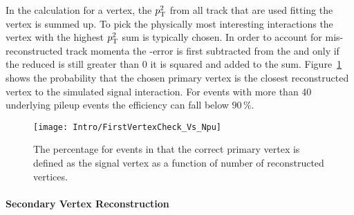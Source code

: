 In the calculation for a vertex, the $p_{\mathrm{T}}^{2}$ from all track that are used fitting the vertex is summed up. To pick the physically most interesting interactions the vertex with the highest $p_{\mathrm{T}}^{2}$ sum is typically chosen. In order to account for mis-reconstructed track momenta the \pt-error is first subtracted from the \pt and only if the reduced \pt is still greater than 0 it is squared and added to the sum. Figure~\ref{plot:IntroSigVertexProb} shows the probability that the chosen primary vertex is the closest reconstructed vertex to the simulated signal interaction. For events with more than 40 underlying pileup events the efficiency can fall below $90\,{}\%{}$.

\begin{figure}[!Hhtb]
    \centering
    \texttt{[image: Intro/FirstVertexCheck\_Vs\_Npu]}
    \caption[Probability to define the correct vertex as signal]{The percentage for events in that the correct primary vertex is defined as the signal vertex as a function of number of reconstructed vertices. \label{plot:IntroSigVertexProb}}
\end{figure}

\paragraph{Secondary Vertex Reconstruction \label{sec:LHCCMSSecVtx}}

